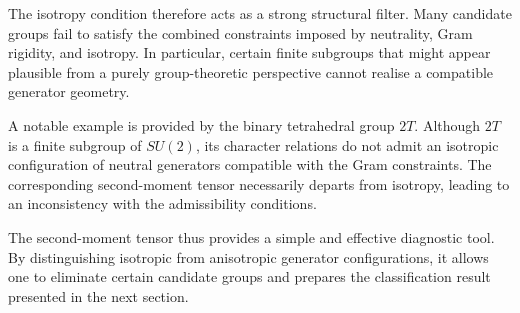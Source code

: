     The isotropy condition therefore acts as a strong structural filter.
    Many candidate groups fail to satisfy the combined constraints imposed by
    neutrality, Gram rigidity, and isotropy.
    In particular, certain finite subgroups that might appear plausible from
    a purely group-theoretic perspective cannot realise a compatible
    generator geometry.

    A notable example is provided by the binary tetrahedral group $2T$.
    Although $2T$ is a finite subgroup of $SU(2)$, its character relations do
    not admit an isotropic configuration of neutral generators compatible
    with the Gram constraints.
    The corresponding second-moment tensor necessarily departs from
    isotropy, leading to an inconsistency with the admissibility conditions.

    The second-moment tensor thus provides a simple and effective diagnostic
    tool.
    By distinguishing isotropic from anisotropic generator configurations,
    it allows one to eliminate certain candidate groups and prepares the
    classification result presented in the next section.
